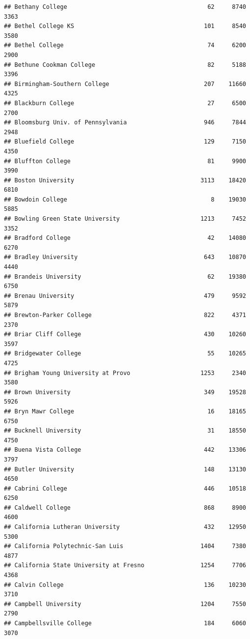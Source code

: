 \documentclass[
]{article}
\begin{document}
\begin{verbatim}
## Bethany College                                        62     8740       3363
## Bethel College KS                                     101     8540       3580
## Bethel College                                         74     6200       2900
## Bethune Cookman College                                82     5188       3396
## Birmingham-Southern College                           207    11660       4325
## Blackburn College                                      27     6500       2700
## Bloomsburg Univ. of Pennsylvania                      946     7844       2948
## Bluefield College                                     129     7150       4350
## Bluffton College                                       81     9900       3990
## Boston University                                    3113    18420       6810
## Bowdoin College                                         8    19030       5885
## Bowling Green State University                       1213     7452       3352
## Bradford College                                       42    14080       6270
## Bradley University                                    643    10870       4440
## Brandeis University                                    62    19380       6750
## Brenau University                                     479     9592       5879
## Brewton-Parker College                                822     4371       2370
## Briar Cliff College                                   430    10260       3597
## Bridgewater College                                    55    10265       4725
## Brigham Young University at Provo                    1253     2340       3580
## Brown University                                      349    19528       5926
## Bryn Mawr College                                      16    18165       6750
## Bucknell University                                    31    18550       4750
## Buena Vista College                                   442    13306       3797
## Butler University                                     148    13130       4650
## Cabrini College                                       446    10518       6250
## Caldwell College                                      868     8900       4600
## California Lutheran University                        432    12950       5300
## California Polytechnic-San Luis                      1404     7380       4877
## California State University at Fresno                1254     7706       4368
## Calvin College                                        136    10230       3710
## Campbell University                                  1204     7550       2790
## Campbellsville College                                184     6060       3070

\end{verbatim}
\end{document}
